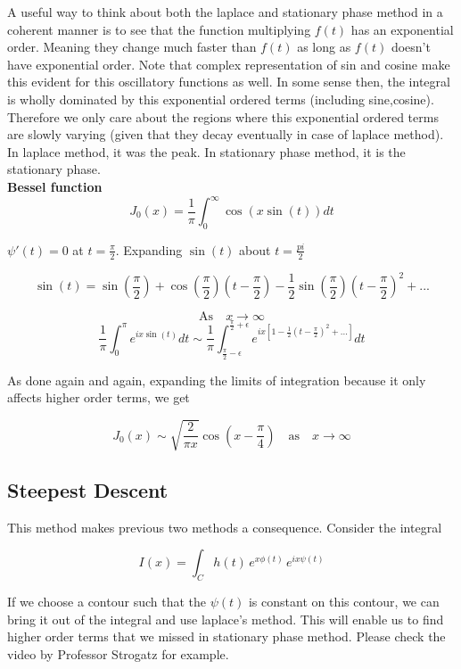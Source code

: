 \documentclass{report}
\begin{document}
\noindent A useful way to think about both the laplace and stationary phase method in a coherent manner is to see that the function multiplying $f(t)$ has an exponential order. Meaning they change much faster than $f(t)$ as long as $f(t)$ doesn't have exponential order. Note that complex representation of sin and cosine make this evident for this oscillatory functions as well. In some sense then, the integral is wholly dominated by this exponential ordered terms (including sine,cosine). Therefore we only care about the regions where this exponential ordered terms are slowly varying (given that they decay eventually in case of laplace method). In laplace method, it was the peak. In stationary phase method, it is the stationary phase.\\

\noindent \textbf{Bessel function}\\

$$J_0(x) = \frac{1}{\pi}\int_{0}^{\infty}\cos(x\sin(t)) dt$$

\noindent $\psi'(t) = 0$ at $t=\frac{\pi}{2}$. Expanding $\sin(t)$ about $t=\frac{pi}{2}$

$$\sin\left(t\right) = \sin\left(\frac{\pi}{2}\right) + \cos\left(\frac{\pi}{2}\right)\left(t-\frac{\pi}{2}\right) -\frac{1}{2}\sin\left(\frac{\pi}{2}\right)\left(t-\frac{\pi}{2}\right)^2 + ...$$

$$\mathrm{As}\quad x\to\infty$$ 
$$\frac{1}{\pi}\int_{0}^{\pi}e^{ix\sin(t)}dt\sim \frac{1}{\pi}\int_{\frac{\pi}{2}-\epsilon}^{\frac{\pi}{2}+\epsilon}e^{ix\left[1-\frac{1}{2}\left(t-\frac{\pi}{2}\right)^2 +...\right]}dt$$

\noindent As done again and again, expanding the limits of integration because it only affects higher order terms, we get 

$$J_0\left(x\right) \sim \sqrt{\frac{2}{\pi x}} \cos\left(x-\frac{\pi}{4}\right) \quad\mathrm{as}\quad x\to\infty$$

\subsection{Steepest Descent}
This method makes previous two methods a consequence. Consider the integral 

$$I(x) = \int_{C}h(t)\, e^{x\phi(t)}\, e^{ix\psi(t)}$$

\noindent If we choose a contour such that the $\psi(t)$ is constant on this contour, we can bring it out of the integral and use laplace's method. This will enable us to find higher order terms that we missed in stationary phase method. Please check the video by Professor Strogatz for example.\\
\end{document}
